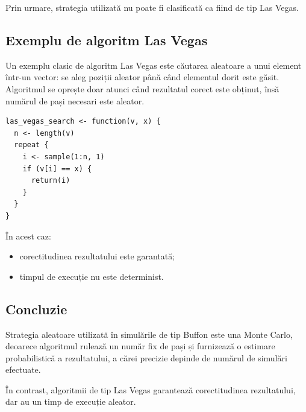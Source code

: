\documentclass[12pt]{article}
\begin{document}
Prin urmare, strategia utilizată nu poate fi clasificată ca fiind de tip Las Vegas.

\subsection{Exemplu de algoritm Las Vegas}

Un exemplu clasic de algoritm Las Vegas este căutarea aleatoare a unui element într-un vector: se aleg poziții aleator până când elementul dorit este găsit. Algoritmul se oprește doar atunci când rezultatul corect este obținut, însă numărul de pași necesari este aleator.

\begin{verbatim}
las_vegas_search <- function(v, x) {
  n <- length(v)
  repeat {
    i <- sample(1:n, 1)
    if (v[i] == x) {
      return(i)
    }
  }
}
\end{verbatim}

În acest caz:
\begin{itemize}
  \item corectitudinea rezultatului este garantată;
  \item timpul de execuție nu este determinist.
\end{itemize}

\subsection{Concluzie}

Strategia aleatoare utilizată în simulările de tip Buffon este una Monte Carlo, deoarece algoritmul rulează un număr fix de pași și furnizează o estimare probabilistică a rezultatului, a cărei precizie depinde de numărul de simulări efectuate.

În contrast, algoritmii de tip Las Vegas garantează corectitudinea rezultatului, dar au un timp de execuție aleator.
\end{document}
